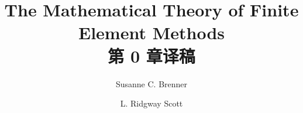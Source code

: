 \documentclass[a4paper,UTF8,12pt]{ctexart}
\title{The Mathematical Theory of Finite Element Methods\\第 0 章译稿}
\author{Susanne C. Brenner \and L. Ridgway Scott}
\date{}
\begin{document}
\maketitle
\setcounter{section}{-1}
\renewcommand{\thethmcount}{\thesubsection.\arabic{thmcount}}
\renewcommand{\theequation}{\thesubsection.\arabic{equation}}
\renewcommand{\thefigure}{\thesection.\arabic{figure}}
\renewcommand{\thetable}{\thesection.\arabic{table}}

\end{document}
